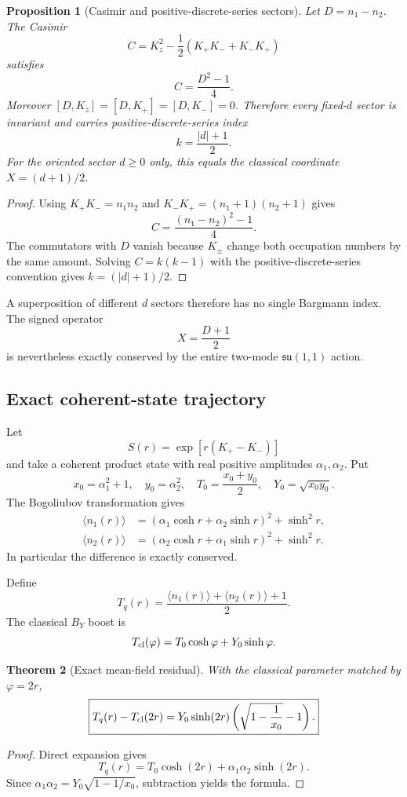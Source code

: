 \documentclass[11pt]{amsart}
\newtheorem{theorem}{Theorem}[section]
\newtheorem{proposition}[theorem]{Proposition}
\theoremstyle{remark}
\begin{document}
\begin{proposition}[Casimir and positive-discrete-series sectors]\label{prop:su11}
Let $D=n_1-n_2$.  The Casimir
\[
C=K_z^2-\frac12(K_+K_-+K_-K_+)
\]
satisfies
\[
C=\frac{D^2-1}{4}.
\]
Moreover $[D,K_z]=[D,K_+]=[D,K_-]=0$.  Therefore every fixed-$d$ sector is invariant and carries positive-discrete-series index
\[
\boxed{k=\frac{|d|+1}{2}}.
\]
For the oriented sector $d\ge0$ only, this equals the classical coordinate $X=(d+1)/2$.
\end{proposition}
\begin{proof}
Using $K_+K_-=n_1n_2$ and $K_-K_+=(n_1+1)(n_2+1)$ gives
\[
C=\frac{(n_1-n_2)^2-1}{4}.
\]
The commutators with $D$ vanish because $K_\pm$ change both occupation numbers by the same amount.  Solving $C=k(k-1)$ with the positive-discrete-series convention gives $k=(|d|+1)/2$.
\end{proof}

A superposition of different $d$ sectors therefore has no single Bargmann index.  The signed operator
\[
X=\frac{D+1}{2}
\]
is nevertheless exactly conserved by the entire two-mode $\mathfrak{su}(1,1)$ action.

\subsection{Exact coherent-state trajectory}
Let
\[
S(r)=\exp[r(K_+-K_-)]
\]
and take a coherent product state with real positive amplitudes $\alpha_1,\alpha_2$.  Put
\[
x_0=\alpha_1^2+1,\quad y_0=\alpha_2^2,\quad T_0=\frac{x_0+y_0}{2},\quad Y_0=\sqrt{x_0y_0}.
\]
The Bogoliubov transformation gives
\begin{align}
\langle n_1(r)\rangle&=(\alpha_1\cosh r+\alpha_2\sinh r)^2+\sinh^2r,\\
\langle n_2(r)\rangle&=(\alpha_2\cosh r+\alpha_1\sinh r)^2+\sinh^2r.
\end{align}
In particular the difference is exactly conserved.

Define
\[
T_q(r)=\frac{\langle n_1(r)\rangle+\langle n_2(r)\rangle+1}{2}.
\]
The classical $B_Y$ boost is
\[
T_{\rm cl}(\varphi)=T_0\cosh\varphi+Y_0\sinh\varphi.
\]

\begin{theorem}[Exact mean-field residual]\label{thm:residual}
With the classical parameter matched by $\varphi=2r$,
\[
\boxed{T_q(r)-T_{\rm cl}(2r)=Y_0\sinh(2r)\left(\sqrt{1-\frac1{x_0}}-1\right).}
\]
\end{theorem}
\begin{proof}
Direct expansion gives
\[
T_q(r)=T_0\cosh(2r)+\alpha_1\alpha_2\sinh(2r).
\]
Since $\alpha_1\alpha_2=Y_0\sqrt{1-1/x_0}$, subtraction yields the formula.
\end{proof}
\end{document}
